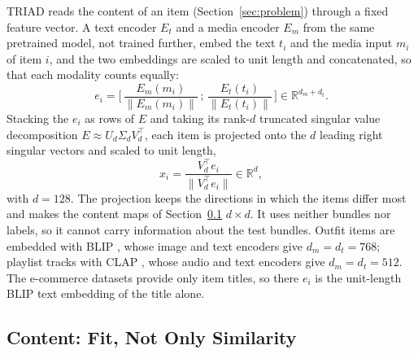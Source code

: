 \documentclass[runningheads]{llncs}
\newcommand{\R}{\mathbb{R}}
\begin{document}
TRIAD reads the content of an item (Section~\ref{sec:problem}) through a fixed feature vector. A text encoder $E_t$
and a media encoder $E_m$ from the same pretrained model, not trained further, embed the text $t_i$ and the media
input $m_i$ of item $i$, and the two embeddings are scaled to unit length and concatenated, so that each modality counts equally:
\begin{equation}
e_i=\Big[\,\frac{E_m(m_i)}{\lVert E_m(m_i)\rVert}\,;\,\frac{E_t(t_i)}{\lVert E_t(t_i)\rVert}\,\Big]\in\R^{d_m+d_t}.
\end{equation}
Stacking the $e_i$ as rows of $E$ and taking its rank-$d$ truncated singular value decomposition
$E\approx U_d\Sigma_dV_d^{\top}$, each item is projected onto the $d$ leading right singular vectors and scaled to unit
length,
\begin{equation}
x_i=\frac{V_d^{\top}e_i}{\lVert V_d^{\top}e_i\rVert}\in\R^{d},
\end{equation}
with $d=128$. The projection keeps the directions in which the items differ most and makes the content maps of
Section~\ref{sec:content} $d\times d$. It uses neither bundles nor labels, so it cannot carry information about the
test bundles. Outfit items are embedded with BLIP \cite{blip}, whose image and text encoders give $d_m=d_t=768$;
playlist tracks with CLAP \cite{clap}, whose audio and text encoders give $d_m=d_t=512$. The e-commerce datasets
provide only item titles, so there $e_i$ is the unit-length BLIP text embedding of the title alone.

\subsection{Content: Fit, Not Only Similarity}
\label{sec:content}
\end{document}
